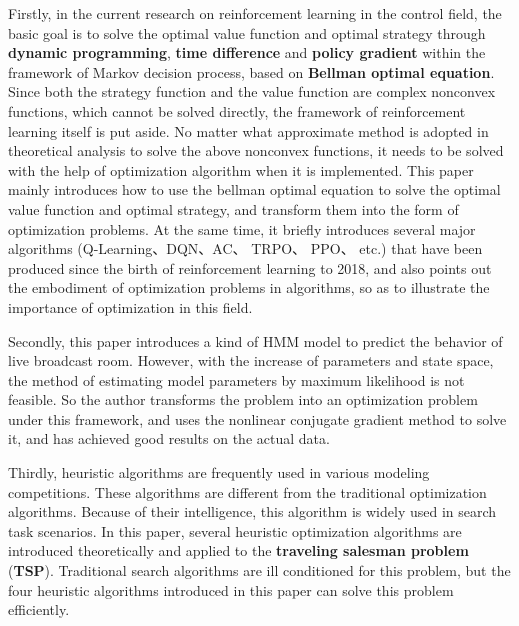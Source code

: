 \begin{abstracten}
Firstly, in the current research on reinforcement learning in the control field, the basic goal is to solve the optimal value function and optimal strategy through \textbf{dynamic programming}, \textbf{time difference} and \textbf{policy gradient} within the framework of Markov decision process, based on \textbf{Bellman optimal equation}. Since both the strategy function and the value function are complex nonconvex functions, which cannot be solved directly, the framework of reinforcement learning itself is put aside. No matter what approximate method is adopted in theoretical analysis to solve the above nonconvex functions, it needs to be solved with the help of optimization algorithm when it is implemented. This paper mainly introduces how to use the bellman optimal equation to solve the optimal value function and optimal strategy, and transform them into the form of optimization problems. At the same time, it briefly introduces several major algorithms (Q-Learning、DQN、AC、 TRPO、 PPO、 etc.) that have been produced since the birth of reinforcement learning to 2018, and also points out the embodiment of optimization problems in algorithms, so as to illustrate the importance of optimization in this field.



Secondly, this paper introduces a kind of HMM model to predict the behavior of live broadcast room. However, with the increase of parameters and state space, the method of estimating model parameters by maximum likelihood is not feasible. So the author transforms the problem into an optimization problem under this framework, and uses the nonlinear conjugate gradient method to solve it, and has achieved good results on the actual data.



Thirdly, heuristic algorithms are frequently used in various modeling competitions. These algorithms are different from the traditional optimization algorithms. Because of their intelligence, this algorithm is widely used in search task scenarios. In this paper, several heuristic optimization algorithms are introduced theoretically and applied to the \textbf{traveling salesman problem} (\textbf{TSP}). Traditional search algorithms are ill conditioned for this problem, but the four heuristic algorithms introduced in this paper can solve this problem efficiently.

\end{abstracten}